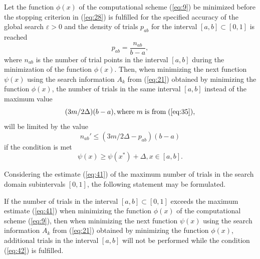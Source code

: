 \documentclass[smallextended]{svjour3}       %
\begin{document}
\begin{theorem}
Let the function $\phi(x)$ of the computational scheme (\ref{eq:9}) be minimized before the stopping criterion in (\ref{eq:28}) is fulfilled for the specified accuracy of the global search $\varepsilon > 0$ and the density of trials $p_{ab}$ for the interval $[a,b] \subset [0,1]$ is reached
\begin{equation}\label{eq:39}
p_{ab}=\frac{n_{ab}}{b-a},
\end{equation}
where $n_{ab}$ is the number of trial points in the interval $[a,b]$ during the minimization of the function $\phi(x)$. Then, when minimizing the next function $\psi(x)$ using the search information $A_k$ from (\ref{eq:21}) obtained by minimizing the function $\phi(x)$, the number of trials in the same interval $[a,b]$ instead of the maximum value
\begin{equation}\label{eq:40}
(3m/2\Delta)(b-a), \text{where} \; m \; \text{is from} \;  (\ref{eq:35}),
\end{equation}
will be limited by the value
\begin{equation}\label{eq:41}
n_{ab}' \leq (3m/2\Delta - p_{ab})(b-a)
\end{equation}
if the condition is met
\begin{equation}\label{eq:42}
\psi(x) \geq \psi(x^*)+\Delta, x \in [a,b].
\end{equation}
\end{theorem}

Considering the estimate (\ref{eq:41}) of the maximum number of trials in the search domain subintervals $[0,1]$, the following statement may be formulated.

\begin{theorem}
If the number of trials in the interval $[a,b]\subset[0,1]$ exceeds the maximum estimate (\ref{eq:41}) when minimizing the function $\phi(x)$ of the computational scheme (\ref{eq:9}), then when minimizing the next function $\psi(x)$ using the search information $A_k$ from (\ref{eq:21}) obtained by minimizing the function $\phi(x)$, additional trials in the interval $[a,b]$ will not be performed while the condition (\ref{eq:42}) is fulfilled.
\end{theorem}
\end{document}
